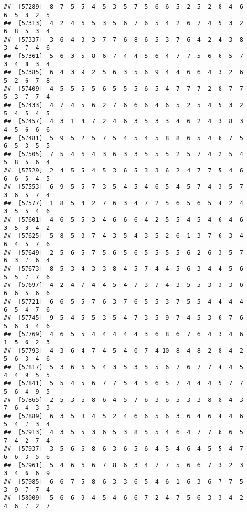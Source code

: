 \documentclass[
]{book}
\begin{document}
\begin{verbatim}
##  [57289]  8  7  5  5  4  5  3  5  7  5  6  6  5  2  5  2  8  4  6  6  5  3  2  5
##  [57313]  4  2  4  6  5  3  5  6  7  6  5  4  2  6  7  4  5  3  2  6  8  5  3  4
##  [57337]  3  6  4  3  3  7  7  6  8  6  5  3  7  6  4  2  4  3  8  3  4  7  4  6
##  [57361]  5  6  3  5  8  6  7  4  4  5  6  4  7  7  5  6  6  5  7  3  4  8  3  4
##  [57385]  6  4  3  9  2  5  6  3  5  6  9  4  4  6  6  4  3  2  6  5  2  6  7  8
##  [57409]  4  5  5  5  5  6  5  5  5  6  5  4  7  7  7  2  8  7  7  5  3  7  7  4
##  [57433]  4  7  4  5  6  2  7  6  6  6  4  6  5  2  5  4  5  3  2  5  4  5  4  5
##  [57457]  4  3  1  4  7  2  4  6  3  5  3  3  4  6  2  4  3  8  3  4  5  6  6  6
##  [57481]  5  9  5  2  5  7  5  4  5  4  5  8  8  6  5  4  6  7  5  6  5  3  5  5
##  [57505]  7  5  4  6  4  3  6  3  3  5  5  5  2  5  7  4  2  5  4  5  8  5  6  4
##  [57529]  2  4  5  5  4  5  3  6  5  3  3  6  2  4  7  7  5  4  6  6  6  5  4  5
##  [57553]  6  9  5  5  7  3  5  4  5  4  6  5  4  5  7  4  3  5  7  3  6  5  7  4
##  [57577]  1  8  5  4  2  7  6  3  4  7  2  5  6  5  6  5  4  2  4  3  5  5  4  6
##  [57601]  4  6  5  5  3  4  6  6  6  4  2  5  5  4  5  4  6  4  6  3  5  3  4  2
##  [57625]  5  8  5  3  7  4  3  5  4  3  5  2  6  1  3  7  6  3  4  6  4  5  7  6
##  [57649]  2  5  6  5  7  5  6  5  6  5  5  5  5  6  2  6  3  5  7  6  3  7  6  4
##  [57673]  8  5  3  4  3  3  8  4  5  7  4  4  5  6  3  4  4  5  6  5  5  7  7  6
##  [57697]  4  2  4  7  4  4  5  4  7  3  7  4  3  5  5  3  3  3  6  6  6  5  6  6
##  [57721]  6  6  5  5  7  6  3  7  6  5  5  3  7  5  5  4  4  4  4  6  5  4  7  6
##  [57745]  9  5  4  5  5  3  5  4  7  3  5  9  7  4  5  3  6  7  6  5  6  3  4  6
##  [57769]  4  6  5  5  4  4  4  4  4  3  6  8  6  7  6  4  3  4  6  1  5  6  2  3
##  [57793]  4  3  6  4  7  4  5  4  0  7  4 10  8  4  8  2  8  4  2  5  6  3  4  6
##  [57817]  5  3  6  6  5  4  3  5  3  5  5  6  7  6  7  7  4  4  5  4  4  9  5  5
##  [57841]  5  5  4  5  6  7  7  5  4  5  6  5  7  4  4  4  5  7  7  5  6  4  9  5
##  [57865]  2  5  3  6  8  6  4  5  7  6  3  6  5  3  3  8  8  4  3  7  6  4  3  3
##  [57889]  6  3  5  8  4  5  2  4  6  6  5  6  3  6  4  6  4  4  6  5  4  7  3  4
##  [57913]  4  3  5  5  3  6  5  3  8  5  5  4  6  4  7  7  6  6  5  7  4  2  7  4
##  [57937]  3  5  6  6  8  6  3  6  5  6  4  5  4  6  4  5  5  4  7  6  6  3  5  6
##  [57961]  5  4  6  6  6  7  8  6  3  4  7  7  5  6  6  7  3  2  3  3  4  6  6  9
##  [57985]  6  6  7  5  8  6  3  3  6  5  4  6  1  6  3  6  7  7  5  3  9  7  7  4
##  [58009]  5  6  6  9  4  5  4  6  6  7  2  4  7  5  6  3  3  4  2  4  6  7  2  7

\end{verbatim}
\end{document}
